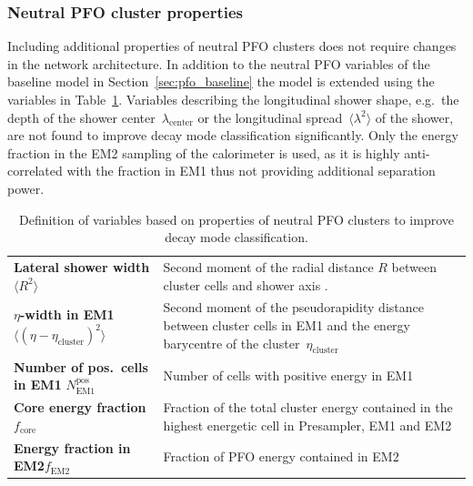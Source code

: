 \subsubsection{Neutral PFO cluster properties}

Including additional properties of neutral PFO clusters does not require changes
in the network architecture. In addition to the neutral PFO variables of the
baseline model in Section~\ref{sec:pfo_baseline} the model is extended using the
variables in Table~\ref{tab:cluster_variables}. Variables describing the
longitudinal shower shape, e.g.\ the depth of the shower
center~$\lambda_\text{center}$ or the longitudinal
spread~$\langle \lambda^2 \rangle$ of the shower, are not found to improve decay
mode classification significantly. 
Only the energy fraction in the EM2 sampling of the calorimeter is used, as it
is highly anti-correlated with the fraction in EM1 thus not providing additional
separation power.

\begin{table}[htb]
  \centering
  {\def\arraystretch{1.5}
  \begin{tabular}{p{5cm}p{9cm}}
    \toprule
    \textbf{Lateral shower width}\newline$\langle R^2 \rangle$ &
    Second moment of the radial distance $R$ between cluster cells and shower axis \cite{atlas_topoclustering}. \\

    \textbf{$\eta$-width in EM1}\newline$\langle (\eta - \eta_\text{cluster})^2\rangle$ &
    Second moment of the pseudorapidity distance between cluster cells in EM1
    and the energy barycentre of the cluster~$\eta_\text{cluster}$~\cite{atlas:taurec:decaymodes} \\

    \textbf{Number of pos.\ cells in EM1} $N_\text{EM1}^\text{pos}$ &
    Number of cells with positive energy in EM1~\cite{atlas:taurec:decaymodes}\\

    \textbf{Core energy fraction}\newline$f_\text{core}$ &
    Fraction of the total cluster energy contained in the highest energetic cell
    in Presampler, EM1 and EM2~\cite{atlas_topoclustering} \\

    \textbf{Energy fraction in EM2}\newline$f_\text{EM2}$ &
    Fraction of PFO energy contained in EM2\\
    \bottomrule
  \end{tabular}
  }
  \caption{Definition of variables based on properties of neutral PFO clusters
    to improve decay mode classification.}
  \label{tab:cluster_variables}
\end{table}

